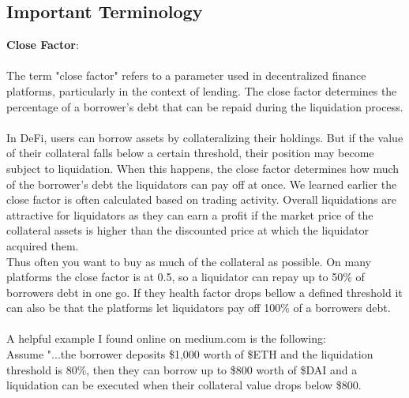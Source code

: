 \documentclass{article}
\begin{document}
\subsection{Important Terminology}
\textbf{Close Factor}:\\\\
The term "close factor" refers to a parameter used in decentralized finance platforms, particularly in the context of lending. The close factor determines the percentage of a borrower's debt that can be repaid during the liquidation process.\\\\In DeFi, users can borrow assets by collateralizing their holdings. But if the value of their collateral falls below a certain threshold, their position may become subject to liquidation. When this happens, the close factor determines how much of the borrower's debt the liquidators can pay off at once. We learned earlier the close factor is often calculated based on trading activity. Overall liquidations are attractive for liquidators as they can earn a profit if the market price of the collateral assets is higher than the discounted price at which the liquidator acquired them.\\ Thus often you want to buy as much of the collateral as possible. On many platforms the close factor is at 0.5, so a liquidator can repay up to 50\% of borrowers debt in one go. If they health factor drops bellow a defined threshold it can also be that the platforms let liquidators pay off 100\% of a borrowers debt.\\\\A helpful example I found online on medium.com is the following:\\
Assume "...the borrower deposits \$1,000 worth of \$ETH and the liquidation threshold is 80\%, then they can borrow up to \$800 worth of \$DAI and a liquidation can be executed when their collateral value drops below \$800.
\end{document}
